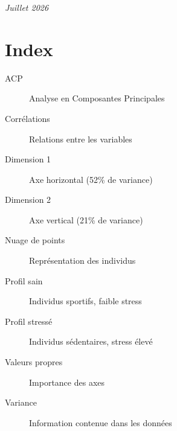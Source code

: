\documentclass[12pt,a4paper]{book}
\begin{document}
	\vspace{0.3cm}
	
	\begin{center}
	\end{center}
	
	\vspace{0.5cm}
	\begin{flushright}
		\textit{Juillet 2026}
	\end{flushright}
	
	\chapter*{Index}
	
	\begin{description}
		\item[ACP] Analyse en Composantes Principales
		\item[Corrélations] Relations entre les variables
		\item[Dimension 1] Axe horizontal (52\% de variance)
		\item[Dimension 2] Axe vertical (21\% de variance)
		\item[Nuage de points] Représentation des individus
		\item[Profil sain] Individus sportifs, faible stress
		\item[Profil stressé] Individus sédentaires, stress élevé
		\item[Valeurs propres] Importance des axes
		\item[Variance] Information contenue dans les données
	\end{description}
	
\end{document}
